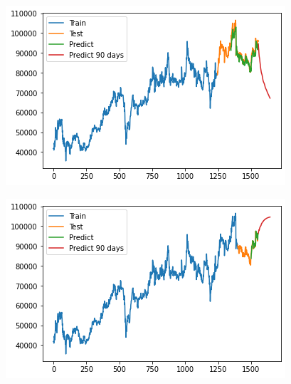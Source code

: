 \documentclass[conference]{IEEEtran}
\begin{document}
\begin{minipage}{0.23\textwidth}
    \centering
    \includegraphics[width=\linewidth]{images/RNN/RNN_VCB_90days_82.png}
    \label{fig:image1}
\end{minipage}
\hfill
\begin{minipage}{0.23\textwidth}
    \centering
    \includegraphics[width=\linewidth]{images/RNN/RNN_VCB_90days_91.png}
    \label{fig:image2}
\end{minipage}
\end{document}
